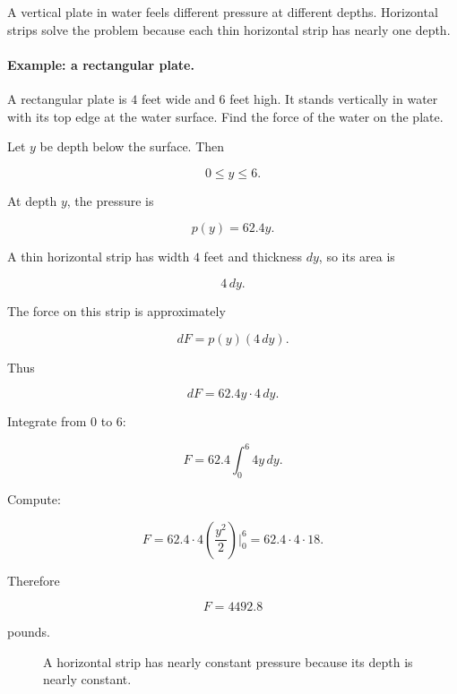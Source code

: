 A vertical plate in water feels different pressure at different depths.  Horizontal strips
solve the problem because each thin horizontal strip has nearly one depth.

\paragraph{Example: a rectangular plate.}
A rectangular plate is \(4\) feet wide and \(6\) feet high.  It stands vertically in water
with its top edge at the water surface.  Find the force of the water on the plate.

Let \(y\) be depth below the surface.  Then

\[
0\le y\le6.
\]

At depth \(y\), the pressure is

\[
p(y)=62.4y.
\]

A thin horizontal strip has width \(4\) feet and thickness \(dy\), so its area is

\[
4\,dy.
\]

The force on this strip is approximately

\[
dF=p(y)(4\,dy).
\]

Thus

\[
dF=62.4y\cdot4\,dy.
\]

Integrate from \(0\) to \(6\):

\[
F=62.4\int_0^6 4y\,dy.
\]

Compute:

\[
F=62.4\cdot4\left(\frac{y^2}{2}\right)\Big|_0^6
=
62.4\cdot4\cdot18.
\]

Therefore

\[
F=\boxed{4492.8}
\]

pounds.

\begin{figure}[h]
\centering
{}
\caption{A horizontal strip has nearly constant pressure because its depth is nearly constant.}
\label{fig:hydrostatic-rectangular-plate}
\end{figure}

